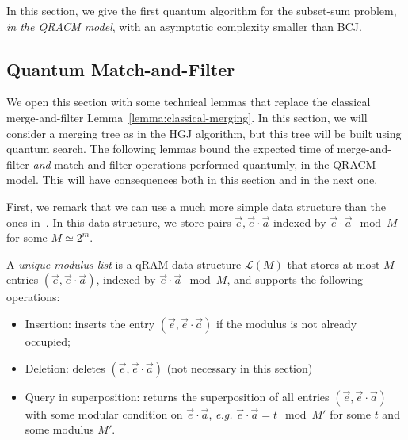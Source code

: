 
In this section, we give the first quantum algorithm for the subset-sum problem, \emph{in the QRACM model}, with an asymptotic complexity smaller than BCJ.

\subsection{Quantum Match-and-Filter}

We open this section with some technical lemmas that replace the classical merge-and-filter Lemma~\ref{lemma:classical-merging}. In this section, we will consider a merging tree as in the HGJ algorithm, but this tree will be built using quantum search. The following lemmas bound the expected time of merge-and-filter \emph{and} match-and-filter operations performed quantumly, in the QRACM model. This will have consequences both in this section and in the next one.



First, we remark that we can use a much more simple data structure than the ones in~\cite{DBLP:journals/siamcomp/Ambainis07,DBLP:conf/pqcrypto/BernsteinJLM13}. In this data structure, we store pairs $\vec{e}, \vec{e} \cdot \vec{a}$ indexed by $\vec{e} \cdot \vec{a} \mod M$ for some $M \simeq 2^m$. %

\begin{definition}\label{def:unique-mod}
A \emph{unique modulus list} is a qRAM data structure $\mathcal{L}(M)$ that stores at most $M$ entries $(\vec{e}, \vec{e} \cdot \vec{a})$, indexed by $\vec{e} \cdot \vec{a} \mod M$, and supports the following operations:
\begin{itemize}
\item Insertion: inserts the entry $(\vec{e}, \vec{e} \cdot \vec{a})$ if the modulus is not already occupied;
\item Deletion: deletes $(\vec{e}, \vec{e} \cdot \vec{a})$ (not necessary in this section)
\item Query in superposition: returns the superposition of all entries $(\vec{e}, \vec{e} \cdot \vec{a})$ with some modular condition on $\vec{e} \cdot \vec{a}$, \emph{e.g.} $\vec{e} \cdot \vec{a} = t \mod M'$ for some $t$ and some modulus $M'$.
\end{itemize}
\end{definition}

